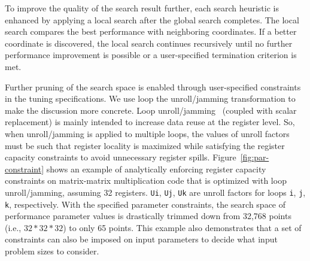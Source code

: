 

To improve the quality of the search result further, each search heuristic is
enhanced by applying a local search after the global search completes. The
local search compares the best performance with neighboring coordinates. If a
better coordinate is discovered, the local search continues recursively until
no further performance improvement is possible or a user-specified
termination criterion is met.

Further pruning of the search space is enabled through user-specified
constraints in the tuning specifications. We use loop the
unroll/jamming transformation to make the discussion more concrete. Loop
unroll/jamming~\cite{sarkar-unrolljam} (coupled with scalar replacement) is
mainly intended to increase data reuse at the register level. So, when
unroll/jamming is applied to multiple loops, the values of unroll factors
must be such that register locality is maximized while satisfying the
register capacity constraints to avoid unnecessary register
spills. Figure~\ref{fig:par-constraint} shows an example of analytically
enforcing register capacity constraints on matrix-matrix multiplication code
that is optimized with loop unroll/jamming, assuming 32
registers. \texttt{Ui}, \texttt{Uj}, \texttt{Uk} are unroll factors for loops
\texttt{i}, \texttt{j}, \texttt{k}, respectively. With the specified
parameter constraints, the search space of performance parameter values is
drastically trimmed down from 32,768 points (i.e., $32*32*32$) to only 65
points. This example also demonstrates that a set of constraints can also be
imposed on input parameters to decide what input problem sizes to consider.

